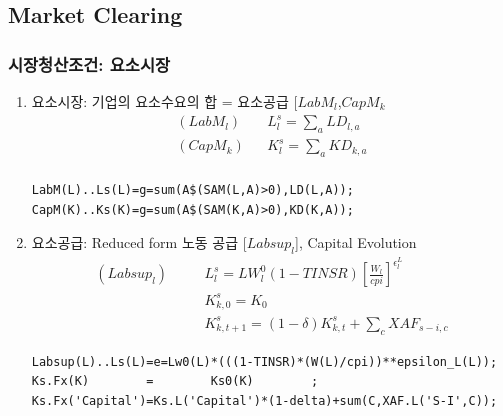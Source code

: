 \documentclass[10pt,compress,slidetop,%
			   hyperref={unicode},xcolor={svgnames},%
			   t]{beamer}
\begin{document}
\subsection{Market Clearing}

\begin{frame}[fragile]
\frametitle{시장청산조건: 요소시장}
\begin{scriptsize}
\begin{enumerate}
\item{요소시장: 기업의 요소수요의 합 = 요소공급 [$LabM_l$,$CapM_k$}
\begin{eqnarray*}
(LabM_l)& & L^s_l=\sum_a LD_{l,a}\\
(CapM_k)& & K^s_l=\sum_a KD_{k,a}\\
\end{eqnarray*}
\begin{verbatim}
LabM(L)..Ls(L)=g=sum(A$(SAM(L,A)>0),LD(L,A));
CapM(K)..Ks(K)=g=sum(A$(SAM(K,A)>0),KD(K,A));
\end{verbatim}

\item{요소공급: Reduced form 노동 공급 [$Labsup_l$], Capital Evolution}
\begin{eqnarray*}
(Labsup_l)&\quad& L^s_l=LW^0_l(1-TINSR)\left[\frac{W_l}{cpi}\right]^{\epsilon^L_l}\\
& &K^s_{k,0}=K_0\\
& &K^s_{k,t+1}=(1-\delta)K^s_{k,t}+\sum_cXAF_{s-i,c}
\end{eqnarray*}

\begin{verbatim}
Labsup(L)..Ls(L)=e=Lw0(L)*(((1-TINSR)*(W(L)/cpi))**epsilon_L(L));
Ks.Fx(K)        =        Ks0(K)        ;
Ks.Fx('Capital')=Ks.L('Capital')*(1-delta)+sum(C,XAF.L('S-I',C));
\end{verbatim}
\end{enumerate}

\end{scriptsize}
\end{frame}
\end{document}

